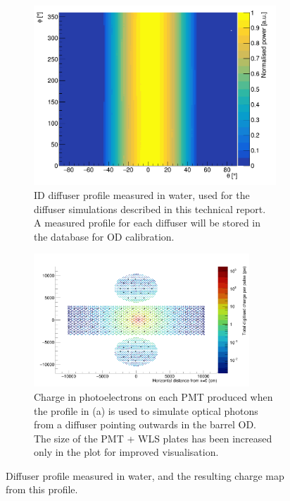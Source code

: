 \documentclass[a4paper,11pt]{article}
\begin{document}
\begin{figure}
    \centering
    \begin{subfigure}{0.45\textwidth}
         \centering
         \includegraphics[width=\linewidth]{Differ_profile.png}
         \caption{ID diffuser profile measured in water, used for the diffuser simulations described in this technical report. A measured profile for each diffuser will be stored in the database for OD calibration.}
         \label{fig:diffuserProfile}
     \end{subfigure}
     \hfill
     \begin{subfigure}{0.5\textwidth}
         \centering
         \includegraphics[width=\linewidth,height=5cm]{diffuse_QCoverage.png}
         \caption{Charge in photoelectrons on each PMT produced when the profile in (a) is used to simulate optical photons from a diffuser pointing outwards in the barrel OD. The size of the PMT + WLS plates has been increased only in the plot for improved visualisation.}
         \label{fig:diffuserChargeMap}
     \end{subfigure}
     \caption{Diffuser profile measured in water, and the resulting charge map from this profile.}
     \label{fig:diffuserProfileSim}
\end{figure}
\end{document}
